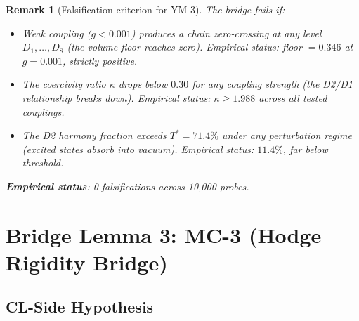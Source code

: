 \documentclass[11pt]{article}
\newtheorem{remark}[lemma]{Remark}
\theoremstyle{definition}
\begin{document}
\begin{remark}[Falsification criterion for YM-3]
\label{rem:ym3-falsify}
The bridge fails if:
\begin{itemize}
  \item Weak coupling ($g < 0.001$) produces a chain zero-crossing
    at any level $D_1, \ldots, D_8$ (the volume floor reaches zero).
    Empirical status: floor $= 0.346$ at $g = 0.001$, strictly positive.
  \item The coercivity ratio $\kappa$ drops below $0.30$ for any coupling
    strength (the D2/D1 relationship breaks down).
    Empirical status: $\kappa \geq 1.988$ across all tested couplings.
  \item The D2 harmony fraction exceeds $T^* = 71.4\%$ under any
    perturbation regime (excited states absorb into vacuum).
    Empirical status: $11.4\%$, far below threshold.
\end{itemize}
\textbf{Empirical status}: 0 falsifications across 10,000 probes.
\end{remark}


\section{Bridge Lemma 3: MC-3 (Hodge Rigidity Bridge)}

\subsection{CL-Side Hypothesis}
\end{document}
